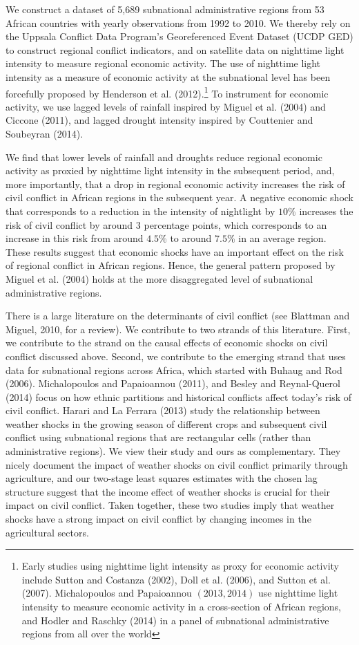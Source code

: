 \documentclass[10pt]{article}
\begin{document}
We construct a dataset of 5,689 subnational administrative regions from 53 African countries with yearly observations from 1992 to 2010. 
We thereby rely on the Uppsala Conflict Data Program's Georeferenced Event Dataset (UCDP GED) to construct regional conflict indicators, and on satellite data on nighttime light intensity to measure regional economic activity. 
The use of nighttime light intensity as a measure of economic activity at the subnational level has been forcefully proposed by Henderson et al. (2012).\footnote{Early studies using nighttime light intensity as proxy for economic activity include Sutton and Costanza (2002), Doll et al. (2006), and Sutton et al. (2007). Michalopoulos and Papaioannou $(2013,2014)$ use nighttime light intensity to measure economic activity in a cross-section of African regions, and Hodler and Raschky (2014) in a panel of subnational administrative regions from all over the world}
To instrument for economic activity, we use lagged levels of rainfall inspired by Miguel et al. (2004) and Ciccone (2011), and lagged drought intensity inspired by Couttenier and Soubeyran (2014).

We find that lower levels of rainfall and droughts reduce regional economic activity as proxied by nighttime light intensity in the subsequent period, and, more importantly, that a drop in regional economic activity increases the risk of civil conflict in African regions in the subsequent year. 
A negative economic shock that corresponds to a reduction in the intensity of nightlight by $10 \%$ increases the risk of civil conflict by around 3 percentage points, which corresponds to an increase in this risk from around $4.5 \%$ to around $7.5 \%$ in an average region. 
These results suggest that economic shocks have an important effect on the risk of regional conflict in African regions. 
Hence, the general pattern proposed by Miguel et al. (2004) holds at the more disaggregated level of subnational administrative regions.

There is a large literature on the determinants of civil conflict (see Blattman and Miguel, 2010, for a review). 
We contribute to two strands of this literature. 
First, we contribute to the strand on the causal effects of economic shocks on civil conflict discussed above. 
Second, we contribute to the emerging strand that uses data for subnational regions across Africa, which started with Buhaug and Rod (2006). 
Michalopoulos and Papaioannou (2011), and Besley and Reynal-Querol (2014) focus on how ethnic partitions and historical conflicts affect today's risk of civil conflict. 
Harari and La Ferrara (2013) study the relationship between weather shocks in the growing season of different crops and subsequent civil conflict using subnational regions that are rectangular cells (rather than administrative regions). 
We view their study and ours as complementary. 
They nicely document the impact of weather shocks on civil conflict primarily through agriculture, and our two-stage least squares estimates with the chosen lag structure suggest that the income effect of weather shocks is crucial for their impact on civil conflict. 
Taken together, these two studies imply that weather shocks have a strong impact on civil conflict by changing incomes in the agricultural sectors.
\end{document}
